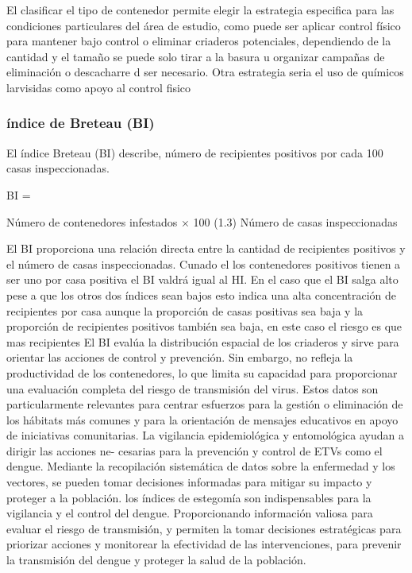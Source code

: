 \documentclass[
  letterpaper,
  twocolumn,
  landscape]{report}
\begin{document}
El clasificar el tipo de contenedor permite elegir la estrategia
especifica para las condiciones particulares del área de estudio, como
puede ser aplicar control físico para mantener bajo control o eliminar
criaderos potenciales, dependiendo de la cantidad y el tamaño se puede
solo tirar a la basura u organizar campañas de eliminación o descacharre
d ser necesario. Otra estrategia seria el uso de químicos larvisidas
como apoyo al control fisico

\subsubsection{índice de Breteau (BI)}\label{uxedndice-de-breteau-bi}

El índice Breteau (BI) describe, número de recipientes positivos por
cada 100 casas inspeccionadas.

BI =

Número de contenedores infestados × 100 (1.3) Número de casas
inspeccionadas

El BI proporciona una relación directa entre la cantidad de recipientes
positivos y el número de casas inspeccionadas. Cunado el los
contenedores positivos tienen a ser uno por casa positiva el BI valdrá
igual al HI. En el caso que el BI salga alto pese a que los otros dos
índices sean bajos esto indica una alta concentración de recipientes por
casa aunque la proporción de casas positivas sea baja y la proporción de
recipientes positivos también sea baja, en este caso el riesgo es que
mas recipientes El BI evalúa la distribución espacial de los criaderos y
sirve para orientar las acciones de control y prevención. Sin embargo,
no refleja la productividad de los contenedores, lo que limita su
capacidad para proporcionar una evaluación completa del riesgo de
transmisión del virus. Estos datos son particularmente relevantes para
centrar esfuerzos para la gestión o eliminación de los hábitats más
comunes y para la orientación de mensajes educativos en apoyo de
iniciativas comunitarias. La vigilancia epidemiológica y entomológica
ayudan a dirigir las acciones ne- cesarias para la prevención y control
de ETVs como el dengue. Mediante la recopilación sistemática de datos
sobre la enfermedad y los vectores, se pueden tomar decisiones
informadas para mitigar su impacto y proteger a la población. los
índices de estegomía son indispensables para la vigilancia y el control
del dengue. Proporcionando información valiosa para evaluar el riesgo de
transmisión, y permiten la tomar decisiones estratégicas para priorizar
acciones y monitorear la efectividad de las intervenciones, para
prevenir la transmisión del dengue y proteger la salud de la población.
\end{document}
